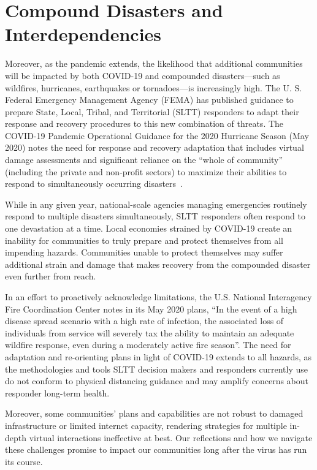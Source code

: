 \section{Compound Disasters and Interdependencies}

Moreover, as the pandemic extends, the likelihood that additional communities will be impacted by both COVID-19 and compounded disasters—such as wildfires, hurricanes, earthquakes or tornadoes—is increasingly high. The U. S. Federal Emergency Management Agency (FEMA) has published guidance to prepare State, Local, Tribal, and Territorial (SLTT) responders to adapt their response and recovery procedures to this new combination of threats. The COVID-19 Pandemic Operational Guidance for the 2020 Hurricane Season (May 2020) notes the need for response and recovery adaptation that includes virtual damage assessments and significant reliance on the “whole of community” (including the private and non-profit sectors) to maximize their abilities to respond to simultaneously occurring disasters~\cite{FEMAPOG}. 

While in any given year, national-scale agencies managing emergencies routinely respond to multiple disasters simultaneously, SLTT responders often respond to one devastation at a time. Local economies strained by COVID-19 create an inability for communities to truly prepare and protect themselves from all impending hazards. Communities unable to protect themselves may suffer additional strain and damage that makes recovery from the compounded disaster even further from reach.

In an effort to proactively acknowledge limitations, the U.S. National Interagency Fire Coordination Center notes in its May 2020 plans, “In the event of a high disease spread scenario with a high rate of infection, the associated loss of individuals from service will severely tax the ability to maintain an adequate wildfire response, even during a moderately active fire season”. The need for adaptation and re-orienting plans in light of COVID-19 extends to all hazards, as the methodologies and tools SLTT decision makers and responders currently use do not conform to physical distancing guidance and may amplify concerns about responder long-term health.  

Moreover, some communities’ plans and capabilities are not robust to damaged infrastructure or limited internet capacity, rendering strategies for multiple in-depth virtual interactions ineffective at best. Our reflections and how we navigate these challenges promise to impact our communities long after the virus has run its course. 

